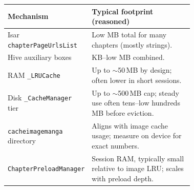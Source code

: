 \begin{center}
\begin{tabular}{@{}lp{0.72\linewidth}@{}}
\hline
\textbf{Mechanism} & \textbf{Typical footprint (reasoned)} \\
\hline
Isar \texttt{chapterPageUrlsList} & Low MB total for many chapters (mostly strings). \\
Hive auxiliary boxes & KB--low MB combined. \\
RAM \texttt{\_LRUCache} & Up to $\sim$50\,MB by design; often lower in short sessions. \\
Disk \texttt{\_CacheManager} tier & Up to $\sim$500\,MB cap; steady use often tens--low hundreds MB before eviction. \\
\texttt{cacheimagemanga} directory & Aligns with image cache usage; measure on device for exact numbers. \\
\texttt{ChapterPreloadManager} & Session RAM, typically small relative to image LRU; scales with preload depth. \\
\hline
\end{tabular}
\end{center}
